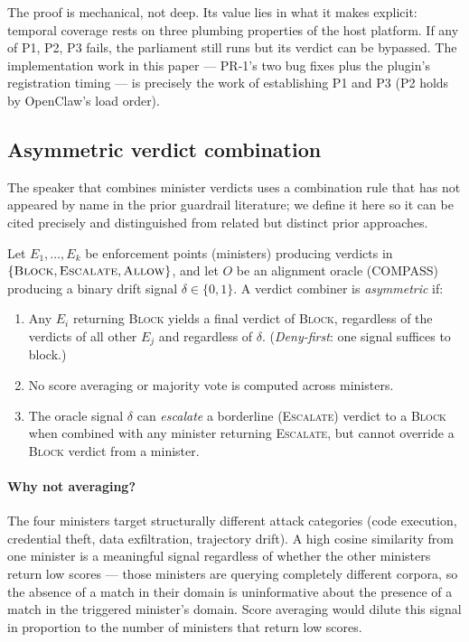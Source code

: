 The proof is mechanical, not deep. Its value lies in what it makes
explicit: temporal coverage rests on three plumbing properties of the
host platform. If any of P1, P2, P3 fails, the parliament still runs but
its verdict can be bypassed. The implementation work in this paper —
PR-1's two bug fixes plus the plugin's registration timing — is precisely
the work of establishing P1 and P3 (P2 holds by OpenClaw's load order).

\subsection{Asymmetric verdict combination}
\label{sec:asymmetric}

The speaker that combines minister verdicts uses a combination rule that has
not appeared by name in the prior guardrail literature; we define it here so
it can be cited precisely and distinguished from related but distinct prior
approaches.

\begin{definition}
\label{def:asymmetric}
Let $E_1, \dots, E_k$ be enforcement points (ministers) producing verdicts in
$\{\textsc{Block}, \textsc{Escalate}, \textsc{Allow}\}$, and let $O$ be an
alignment oracle (COMPASS) producing a binary drift signal $\delta \in \{0,1\}$.
A verdict combiner is \emph{asymmetric} if:
\begin{enumerate}
  \item Any $E_i$ returning \textsc{Block} yields a final verdict of
        \textsc{Block}, regardless of the verdicts of all other $E_j$ and
        regardless of $\delta$. (\emph{Deny-first}: one signal suffices to block.)
  \item No score averaging or majority vote is computed across ministers.
  \item The oracle signal $\delta$ can \emph{escalate} a borderline
        (\textsc{Escalate}) verdict to a \textsc{Block} when combined with
        any minister returning \textsc{Escalate}, but cannot override a
        \textsc{Block} verdict from a minister.
\end{enumerate}
\end{definition}

\paragraph{Why not averaging?} The four ministers target structurally different
attack categories (code execution, credential theft, data exfiltration,
trajectory drift). A high cosine similarity from one minister is a meaningful
signal regardless of whether the other ministers return low scores — those
ministers are querying completely different corpora, so the absence of a match
in their domain is uninformative about the presence of a match in the triggered
minister's domain. Score averaging would dilute this signal in proportion to
the number of ministers that return low scores.

